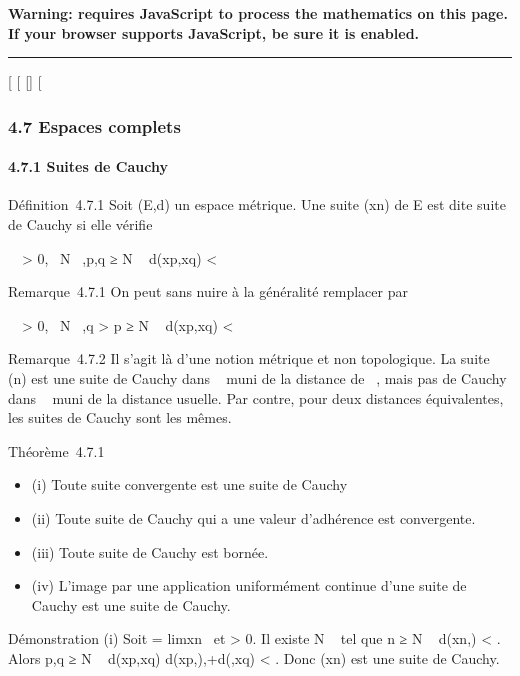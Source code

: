 \textbf{Warning: 
requires JavaScript to process the mathematics on this page.\\ If your
browser supports JavaScript, be sure it is enabled.}

\begin{center}\rule{3in}{0.4pt}\end{center}

{[}
{[}
{[}{]}
{[}

\subsubsection{4.7 Espaces complets}

\paragraph{4.7.1 Suites de Cauchy}

Définition~4.7.1 Soit (E,d) un espace métrique. Une suite (xn)
de E est dite suite de Cauchy si elle vérifie

\forall~~\epsilon \textgreater{} 0,
\exists~N \in {}~,\quad p,q ≥ N \rigtharrow~
d(xp,xq) \textless{} \epsilon

Remarque~4.7.1 On peut sans nuire à la généralité remplacer par

\forall~~\epsilon \textgreater{} 0,
\exists~N \in {}~,\quad q \textgreater{} p
≥ N \rigtharrow~ d(xp,xq) \textless{} \epsilon

Remarque~4.7.2 Il s'agit là d'une notion métrique et non topologique. La
suite (n) est une suite de Cauchy dans ~ muni de la distance de
\overline{}~, mais pas de Cauchy dans ~ muni de la
distance usuelle. Par contre, pour deux distances équivalentes, les
suites de Cauchy sont les mêmes.

Théorème~4.7.1

\begin{itemize}
\itemsep1pt\parskip0pt
\item
  (i) Toute suite convergente est une suite de Cauchy
\item
  (ii) Toute suite de Cauchy qui a une valeur d'adhérence est
  convergente.
\item
  (iii) Toute suite de Cauchy est bornée.
\item
  (iv) L'image par une application uniformément continue d'une suite de
  Cauchy est une suite de Cauchy.
\end{itemize}

Démonstration (i) Soit \ell = limxn~ et
\epsilon \textgreater{} 0. Il existe N \in {}~ tel que n ≥ N \rigtharrow~ d(xn,\ell)
\textless{} \epsilon{}. Alors p,q ≥ N \rigtharrow~ d(xp,xq) \leq
d(xp,\ell),+d(\ell,xq) \textless{} \epsilon. Donc (xn)
est une suite de Cauchy.

